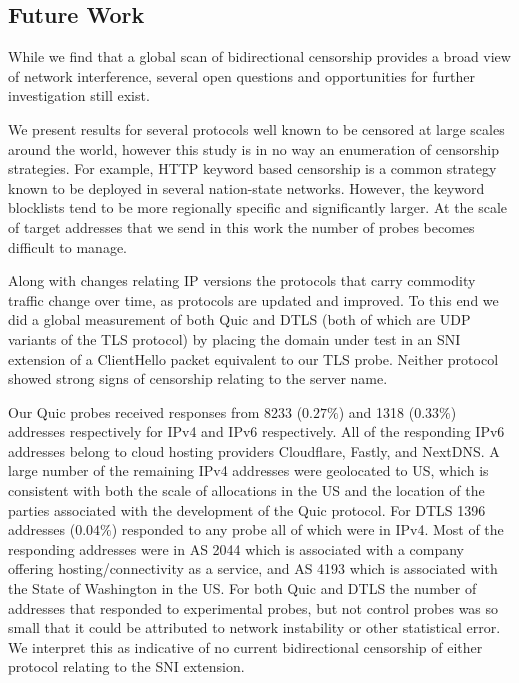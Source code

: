 \subsection{Future Work} \label{sec:discussion:future}

While we find that a global scan of bidirectional censorship provides a broad
view of network interference, several open questions and opportunities for
further investigation still exist.

We present results for several protocols well known to be censored at large
scales around the world, however this study is in no way an enumeration of
censorship strategies. For example, HTTP keyword based censorship is a common
strategy known to be deployed in several nation-state networks. However, the
keyword blocklists tend to be more regionally specific and significantly larger.
At the scale of target addresses that we send in this work the number of probes
becomes difficult to manage.

Along with changes relating IP versions the protocols that carry commodity
traffic change over time, as protocols are updated and improved. To this end we
did a global measurement of both Quic and DTLS (both of which are UDP variants
of the TLS protocol) by placing the domain under test in an SNI extension of a
ClientHello packet equivalent to our TLS probe. Neither protocol showed strong
signs of censorship relating to the server name.

Our Quic probes received responses from 8233 ($0.27\%$) and 1318 ($0.33\%$)
addresses respectively for IPv4 and IPv6 respectively. All of the responding
IPv6 addresses belong to cloud hosting providers Cloudflare, Fastly, and
NextDNS. A large number of the remaining IPv4 addresses were geolocated to US,
which is consistent with both the scale of allocations in the US and the
location of the parties associated with the development of the Quic protocol.
For DTLS 1396 addresses ($0.04\%$) responded to any probe all of which were in
IPv4. Most of the responding addresses were in AS 2044 which is associated with
a company offering hosting/connectivity as a service, and AS 4193 which is
associated with the State of Washington in the US. For both Quic and DTLS the
number of addresses that responded to experimental probes, but not control
probes was so small that it could be attributed to network instability or other
statistical error. We interpret this as indicative of no current bidirectional
censorship of either protocol relating to the SNI extension.


